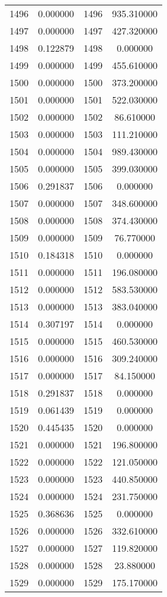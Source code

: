 \documentclass[12pt]{article}
\begin{document}
\begin{longtable}{@{}cccc@{}}
1496 & 0.000000 & 1496 & 935.310000 \\
1497 & 0.000000 & 1497 & 427.320000 \\
1498 & 0.122879 & 1498 & 0.000000 \\
1499 & 0.000000 & 1499 & 455.610000 \\
1500 & 0.000000 & 1500 & 373.200000 \\
1501 & 0.000000 & 1501 & 522.030000 \\
1502 & 0.000000 & 1502 & 86.610000 \\
1503 & 0.000000 & 1503 & 111.210000 \\
1504 & 0.000000 & 1504 & 989.430000 \\
1505 & 0.000000 & 1505 & 399.030000 \\
1506 & 0.291837 & 1506 & 0.000000 \\
1507 & 0.000000 & 1507 & 348.600000 \\
1508 & 0.000000 & 1508 & 374.430000 \\
1509 & 0.000000 & 1509 & 76.770000 \\
1510 & 0.184318 & 1510 & 0.000000 \\
1511 & 0.000000 & 1511 & 196.080000 \\
1512 & 0.000000 & 1512 & 583.530000 \\
1513 & 0.000000 & 1513 & 383.040000 \\
1514 & 0.307197 & 1514 & 0.000000 \\
1515 & 0.000000 & 1515 & 460.530000 \\
1516 & 0.000000 & 1516 & 309.240000 \\
1517 & 0.000000 & 1517 & 84.150000 \\
1518 & 0.291837 & 1518 & 0.000000 \\
1519 & 0.061439 & 1519 & 0.000000 \\
1520 & 0.445435 & 1520 & 0.000000 \\
1521 & 0.000000 & 1521 & 196.800000 \\
1522 & 0.000000 & 1522 & 121.050000 \\
1523 & 0.000000 & 1523 & 440.850000 \\
1524 & 0.000000 & 1524 & 231.750000 \\
1525 & 0.368636 & 1525 & 0.000000 \\
1526 & 0.000000 & 1526 & 332.610000 \\
1527 & 0.000000 & 1527 & 119.820000 \\
1528 & 0.000000 & 1528 & 23.880000 \\
1529 & 0.000000 & 1529 & 175.170000 \\

\end{longtable}
\end{document}
